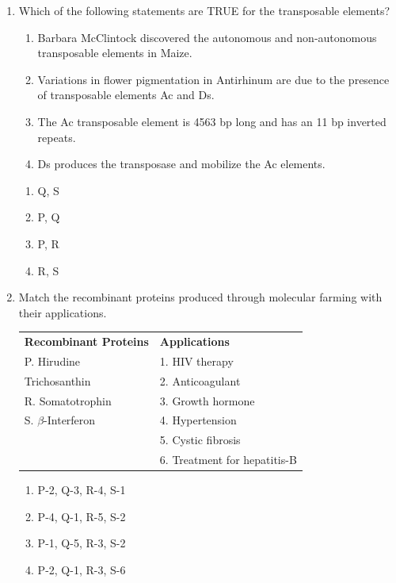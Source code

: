 \documentclass[journal,12pt,onecolumn]{IEEEtran}
\begin{document}
\begin{enumerate}[label=\arabic*.]
\item Which of the following statements are TRUE for the transposable elements?
\begin{enumerate}[label=\Alph*. ,start=16]
\item Barbara McClintock discovered the autonomous and non-autonomous transposable elements in Maize.
\item Variations in flower pigmentation in Antirhinum are due to the presence of transposable elements Ac and Ds.
\item The Ac transposable element is 4563 bp long and has an 11 bp inverted repeats.
\item Ds produces the transposase and mobilize the Ac elements.
\end{enumerate}
\begin{multicols}{4}
\begin{enumerate}[label=(\Alph*)]
\item Q, S
\item P, Q
\item P, R
\item R, S
\end{enumerate}
\end{multicols}

\item Match the recombinant proteins produced through molecular farming with their applications.
\begin{center}
\begin{tabular}{p{5cm} p{6cm}}
\textbf{Recombinant Proteins} & \textbf{Applications}\\
P. Hirudine & 1. HIV therapy\\
 Trichosanthin & 2. Anticoagulant\\
R. Somatotrophin & 3. Growth hormone\\
S. $\beta$-Interferon & 4. Hypertension\\
 & 5. Cystic fibrosis\\
 & 6. Treatment for hepatitis-B\\
\end{tabular}
\end{center}
\begin{multicols}{2}
\begin{enumerate}[label=(\Alph*)]
\item P-2, Q-3, R-4, S-1
\item P-4, Q-1, R-5, S-2
\item P-1, Q-5, R-3, S-2
\item P-2, Q-1, R-3, S-6
\end{enumerate}
\end{multicols}


\end{enumerate}
\end{document}
